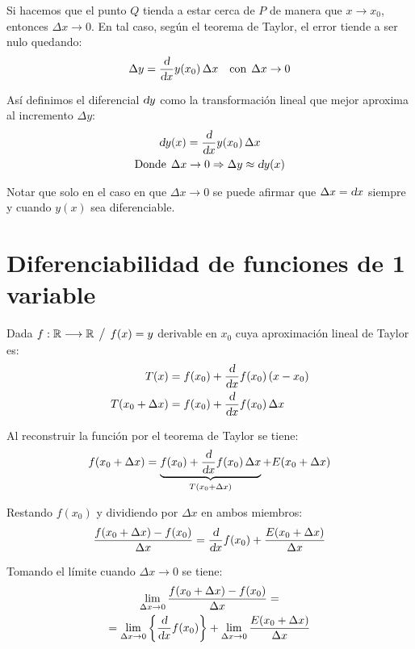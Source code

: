 \documentclass[a5paper,12pt,twoside]{book}
\begin{document}
Si hacemos que el punto $Q$ tienda a estar cerca de $P$ de manera que $x \to x_0$, entonces $\Delta x \to 0$.
En tal caso, según el teorema de Taylor, el error tiende a ser nulo quedando:
\begin{equation*}
    \Delta y = \frac{\textsl{d}}{\textsl{d} x} y(x_0) \, \Delta x \quad \textrm{con} \hspace{1ex} \Delta x \to 0
\end{equation*}

Así definimos el diferencial $\textsl{d} y$ como la transformación lineal que mejor aproxima al incremento $\Delta y$:
\begin{gather*}
    \textsl{d} y(x) = \dfrac{\textsl{d}}{\textsl{d} x} y(x_0) \, \Delta x
    \\
    \textrm{Donde} \hspace{1ex} \Delta x \to 0 \Rightarrow \Delta y \approx \textsl{d} y(x)
\end{gather*}

Notar que solo en el caso en que $\Delta x \to 0$ se puede afirmar que $\Delta x = \textsl{d} x$ siempre y cuando $y(x)$ sea diferenciable.


\section{Diferenciabilidad de funciones de 1 variable}

Dada $f: \mathbb{R} \longrightarrow \mathbb{R} \hspace{1ex} \big/ \hspace{1ex} f(x)=y$ derivable en $x_0$ cuya aproximación lineal de Taylor es:
\begin{align*}
    T(x) &= f(x_0)+\frac{\textsl{d}}{\textsl{d} x} f(x_0) \left(x-x_0\right)
    \\
    T(x_0 + \Delta x) &= f(x_0)+\frac{\textsl{d}}{\textsl{d} x} f(x_0) \, \Delta x
\end{align*}

Al reconstruir la función por el teorema de Taylor se tiene:
\begin{equation*}
    f(x_0 + \Delta x) = \underbrace{f(x_0)+\frac{\textsl{d}}{\textsl{d} x} f(x_0) \, \Delta x}_{T(x_0 + \Delta x)} + E(x_0 + \Delta x)
\end{equation*}

Restando $f(x_0)$ y dividiendo por $\Delta x$ en ambos miembros:
\begin{equation*}
    \frac{f(x_0 + \Delta x)-f(x_0)}{\Delta x} = \frac{\textsl{d}}{\textsl{d} x} f(x_0) + \frac{E(x_0 + \Delta x)}{\Delta x}
\end{equation*}

Tomando el límite cuando $\Delta x \to 0$ se tiene:
\begin{multline*}
    \lim_{\Delta x \to 0} \frac{f(x_0 + \Delta x)-f(x_0)}{\Delta x} =
    \\
    = \lim_{\Delta x \to 0} { \left\{ { \frac{\textsl{d}}{\textsl{d} x} f(x_0) } \right\} } + \lim_{\Delta x \to 0} \frac{E(x_0 + \Delta x)}{\Delta x}
\end{multline*}
\end{document}

